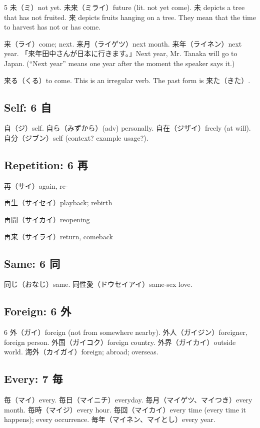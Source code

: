 5 未（ミ）not yet.
未来（ミライ）future (lit. not yet come).
未 depicts a tree that has not fruited.
来 depicts fruits hanging on a tree.
They mean that the time to harvest has not or has come.

来（ライ）come; next.
来月（ライゲツ）next month.
来年（ライネン）next year.
「来年田中さんが日本に行きます。」Next year, Mr. Tanaka will go to Japan.
(``Next year'' means one year after the moment the speaker says it.)

来る（くる）to come.
This is an irregular verb.
The past form is 来た（きた）.

\subsection{Self: 6 自}

自（ジ）self.
自ら（みずから）(adv) personally.
自在（ジザイ）freely (at will).
自分（ジブン）self (context? example usage?).

\subsection{Repetition: 6 再}

再（サイ）again, re-

再生（サイセイ）playback; rebirth

再開（サイカイ）reopening

再来（サイライ）return, comeback

\subsection{Same: 6 同}

同じ（おなじ）same.
同性愛（ドウセイアイ）same-sex love.

\subsection{Foreign: 6 外}

6 外（ガイ）foreign (not from somewhere nearby).
外人（ガイジン）foreigner, foreign person.
外国（ガイコク）foreign country.
外界（ガイカイ）outside world.
海外（カイガイ）foreign; abroad; overseas.

\subsection{Every: 7 毎}

毎（マイ）every.
毎日（マイニチ）everyday.
毎月（マイゲツ、マイつき）every month.
毎時（マイジ）every hour.
毎回（マイカイ）every time (every time it happens); every occurrence.
毎年（マイネン、マイとし）every year.

